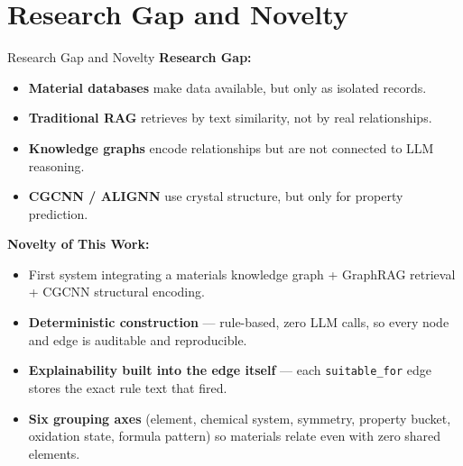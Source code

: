 \documentclass{beamer}
\begin{document}
\section{Research Gap and Novelty}
\begin{frame}{Research Gap and Novelty}
    \textbf{Research Gap:}
    \begin{itemize}
        \item \textbf{Material databases} make data available, but only as isolated records.
        \item \textbf{Traditional RAG} retrieves by text similarity, not by real relationships.
        \item \textbf{Knowledge graphs} encode relationships but are not connected to LLM reasoning.
        \item \textbf{CGCNN / ALIGNN} use crystal structure, but only for property prediction.
    \end{itemize}

    \vspace{0.25cm}
    \textbf{Novelty of This Work:}
    \begin{itemize}
        \item First system integrating a materials knowledge graph + GraphRAG retrieval + CGCNN structural encoding.
        \item \textbf{Deterministic construction} --- rule-based, zero LLM calls, so every node and edge is auditable and reproducible.
        \item \textbf{Explainability built into the edge itself} --- each \texttt{suitable\_for} edge stores the exact rule text that fired.
        \item \textbf{Six grouping axes} (element, chemical system, symmetry, property bucket, oxidation state, formula pattern) so materials relate even with zero shared elements.
    \end{itemize}
\end{frame}
\end{document}
